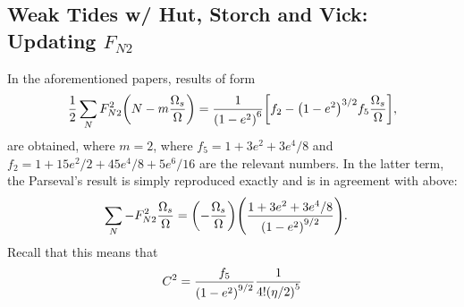 \documentclass[11pt,
        usenames, %
        dvipsnames %
    ]{article}
\DeclarePairedDelimiter\p{\lparen}{\rparen}
\DeclarePairedDelimiter\s{\lbrack}{\rbrack}
\begin{document}
\subsection{Weak Tides w/ Hut, Storch and Vick: Updating $F_{N2}$}

In the aforementioned papers, results of form
\begin{equation}
    \frac{1}{2}\sum\limits_{N}F_{N2}^2 \p*{N - m\frac{\Omega_s}{\Omega}}
        = \frac{1}{\p*{1 - e^2}^6}\s*{f_2 - \p*{1 - e^2}^{3/2}
            f_5\frac{\Omega_s}{\Omega}},
\end{equation}
are obtained, where $m = 2$, where $f_5 = 1 + 3e^2 + 3e^4/8$ and $f_2 = 1 +
15e^2/2 + 45e^4/8 + 5e^6/16$ are the relevant numbers. In the latter term, the
Parseval's result is simply reproduced exactly and is in agreement with above:
\begin{align}
    \sum\limits_N -F_{N2}^2\frac{\Omega_s}{\Omega}
        &= \p*{-\frac{\Omega_s}{\Omega}}\p*{\frac{1 + 3e^2 + 3e^4/8}{
            \p*{1 - e^2}^{9/2}}}.
\end{align}
Recall that this means that
\begin{equation}
    C^2 = \frac{f_5}{\p*{1 - e^2}^{9/2}}\frac{1}{4!\p*{\eta/2}^5}
\end{equation}
\end{document}
